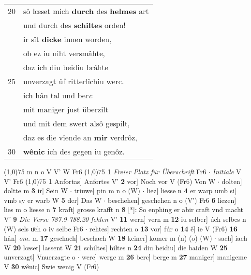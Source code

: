 \documentclass[8pt,a4paper,notitlepage]{article}
\begin{document}
\begin{table}[ht]
\begin{minipage}[t]{0.5\linewidth}
\begin{tabular}{rl}
20 & sô lœset mich \textbf{durch} des \textbf{helmes} art\\ 
 & und durch des \textbf{schiltes} orden!\\ 
 & ir sît \textbf{dicke} innen worden,\\ 
 & ob ez iu niht versmâhte,\\ 
 & daz ich diu beidiu brâhte\\ 
25 & unverzagt ûf ritterlîchiu werc.\\ 
 & ich hân tal und ber\textit{c}\\ 
 & mit maniger just überzilt\\ 
 & und mit dem swert alsô gespilt,\\ 
 & daz es die vîende an \textbf{mir} verdrôz,\\ 
30 & \textbf{wênic} ich des gegen iu genôz.\\ 
\end{tabular}
\scriptsize
\line(1,0){75} \newline
m n o V V' W Fr6 \newline
\line(1,0){75} \newline
\textbf{1} \textit{Freier Platz für Überschrift} Fr6   $\cdot$ \textit{Initiale} V V' Fr6  \newline
\line(1,0){75} \newline
\textbf{1} Anfortas] Anfortes V' \textbf{2} vor] Noch vor V (Fr6) Von W  $\cdot$ dolten] doltte m \textbf{3} ir] Sein W  $\cdot$ triuwe] pin m n o (W)  $\cdot$ liez] liesse n \textbf{4} er warp umb si] vmb sy er warb W \textbf{5} der] Das W  $\cdot$ beschehen] geschehen n o (V') Fr6 \textbf{6} liezen] lies m o liesse n \textbf{7} kraft] grosse krafft n \textbf{8} [*]: So enphing er abir craft vnd macht V' \textbf{9} \textit{Die Verse 787.9-788.20 fehlen} V'  \textbf{11} wern] vern m \textbf{12} iu selber] úch selbes n (W) sels uͯch o iv selbe Fr6  $\cdot$ rehtes] rechten o \textbf{13} vor] fúr o \textbf{14} ê] ie V (Fr6) \textbf{16} hân] \textit{om.} m \textbf{17} geschach] beschach W \textbf{18} keiner] komer m (n) (o) (W)  $\cdot$ sach] iach W \textbf{20} lœset] lassent W \textbf{21} schiltes] hiltes n \textbf{24} diu beidiu] die baiden W \textbf{25} unverzagt] Vnuerzagte o  $\cdot$ werc] werge m \textbf{26} berc] berge m \textbf{27} maniger] manigeme V \textbf{30} wênic] Swie wenig V (Fr6) \newline
\end{minipage}
\end{table}
\newpage
\end{document}
